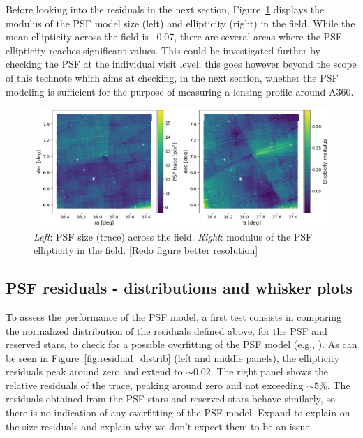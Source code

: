 \documentclass[SE,lsstdraft,authoryear,toc]{lsstdoc}
\begin{document}
Before looking into the residuals in the next section, Figure~\ref{fig:T_and_e} displays the modulus of the PSF model size (left) and ellipticity (right) in the field. While the mean ellipticity across the field is ~0.07, there are several areas where the PSF ellipticity reaches significant values. This could be investigated further by checking the PSF at the individual visit level; this goes however beyond the scope of this technote which aims at checking, in the next section, whether the PSF modeling is sufficient for the purpose of measuring a lensing profile around A360.

\begin{figure}
\centering
\includegraphics[width=\textwidth]{Figures/T_and_e.png}
\caption{\emph{Left}: PSF size (trace) across the field. \emph{Right}: modulus of the PSF ellipticity in the field. {\color{red}[Redo figure better resolution]}\label{fig:T_and_e}}
\end{figure}  


\subsection{PSF residuals - distributions and whisker plots}
To assess the performance of the PSF model, a first test consists in comparing the normalized distribution of the residuals defined above, for the PSF and reserved stars, to check for a possible overfitting of the PSF model (e.g., \citealp{2025OJAp....8E..26S}). As can be seen in Figure~\ref{fig:residual_distrib} (left and middle panels), the ellipticity residuals peak around zero and extend to $\sim 0.02$. The right panel shows the relative residuals of the trace, peaking around zero and not exceeding $\sim 5 \%$. The residuals obtained from the PSF stars and reserved stars behave similarly, so there is no indication of any overfitting of the PSF model.
{\color{red} Expand to explain on the size residuals and explain why we don't expect them to be an issue.}
\end{document}
